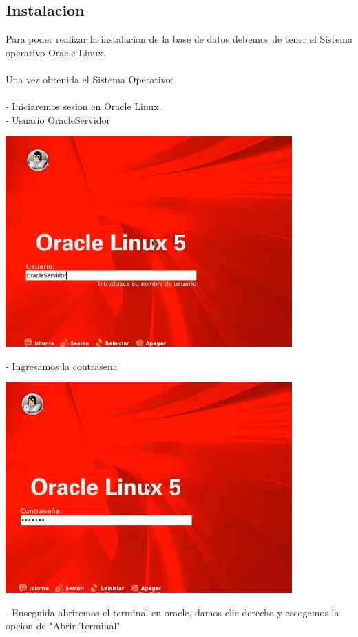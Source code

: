 \documentclass[12pt,letterpaper]{article}
\begin{document}
\subsection{Instalacion}
Para poder realizar la instalacion de la base de datos  debemos de tener  el Sistema operativo Oracle Linux. \\
\\Una vez obtenida el Sistema Operativo:\\ 
\\
- Iniciaremos sesion en Oracle Linux. \\
- Usuario OracleServidor  \\
\begin{center}
\includegraphics[width=11cm]{IMG/oracle1.png} 
\end{center}
- Ingresamos la contrasena \\
\begin{center}
\includegraphics[width=11cm]{IMG/oracle2.png} 
\end{center}
- Enseguida abriremos el terminal en oracle, damos clic derecho y escogemos la opcion de "Abrir Terminal" \\
\end{document}
